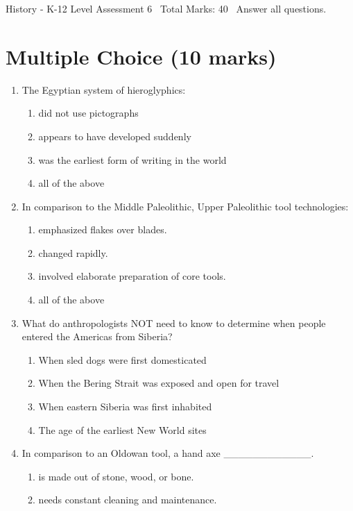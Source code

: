 \documentclass[12pt]{article}
\begin{document}
\begin{center}
History - K-12 Level Assessment 6 \
Total Marks: 40 \
Answer all questions.
\end{center}

\section*{Multiple Choice (10 marks)}
\begin{enumerate}[label=\arabic*.]
\item The Egyptian system of hieroglyphics:
\begin{enumerate}[label=(\alph*)]
    \item did not use pictographs
    \item appears to have developed suddenly
    \item was the earliest form of writing in the world
    \item all of the above
\end{enumerate}
\item In comparison to the Middle Paleolithic, Upper Paleolithic tool technologies:
\begin{enumerate}[label=(\alph*)]
    \item emphasized flakes over blades.
    \item changed rapidly.
    \item involved elaborate preparation of core tools.
    \item all of the above
\end{enumerate}
\item What do anthropologists NOT need to know to determine when people entered the Americas from Siberia?
\begin{enumerate}[label=(\alph*)]
    \item When sled dogs were first domesticated
    \item When the Bering Strait was exposed and open for travel
    \item When eastern Siberia was first inhabited
    \item The age of the earliest New World sites
\end{enumerate}
\item In comparison to an Oldowan tool, a hand axe \_\_\_\_\_\_\_\_\_\_\_\_.
\begin{enumerate}[label=(\alph*)]
    \item is made out of stone, wood, or bone.
    \item needs constant cleaning and maintenance.

\end{enumerate}
\end{enumerate}
\end{document}
